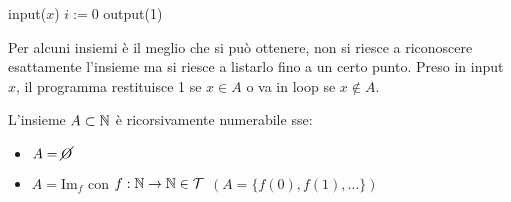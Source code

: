 \hspace{2em}
\begin{minipage}{.32\textwidth}
    \begin{tcolorbox}[
        colback=white,
        sharp corners,
        boxrule=.3mm,
        boxsep=0pt,
        left=20pt
    ]
    \begin{algorithm}[H]
        \SetAlgoNoEnd
        input($x$)\;
        $i:=0$\;
        output(1)\;
    \end{algorithm}
    \end{tcolorbox}
\end{minipage}
\hspace{2em}
\begin{minipage}{.49\textwidth}
    Per alcuni insiemi è il meglio che si può ottenere, non si riesce a riconoscere
    esattamente l'insieme ma si riesce a listarlo fino a un certo punto. Preso in
    input $x$, il programma restituisce 1 se $x\in A$ o va in loop se $x\notin A$.
\end{minipage}\vspace{1em}

L'insieme $A\subset\mathbb{N}$ è ricorsivamente numerabile sse:
\begin{itemize}
    \item $A=\cancel{O}$
    \item $A=\text{Im}_f$ con $f:\mathbb{N}\to\mathbb{N}\in\mathcal{T}$ \hspace{6em} $(A=\{f(0),f(1),\dots\})$ 
\end{itemize}\vspace{1em}

